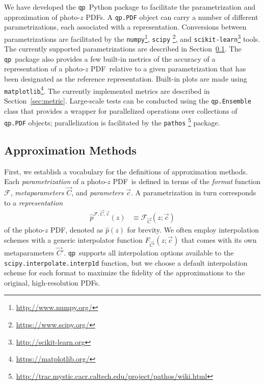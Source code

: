 \documentclass[\docopts]{\docclass}
\newcommand{\qp}{\texttt{qp}}
\newcommand{\pz}{photo-$z$ PDF}
\begin{document}
We have developed the \qp\ Python package to facilitate the parametrization and 
approximation of \pz s.
A \texttt{qp.PDF} object can carry a number of different parametrizations, each 
associated with a representation.
Conversions between parametrizations are facilitated by the 
\texttt{numpy}\footnote{\url{http://www.numpy.org/}}, \texttt{scipy} 
\footnote{\url{https://www.scipy.org/}}, and 
\texttt{scikit-learn}\footnote{\url{http://scikit-learn.org}} 
\citep{pedregosa_scikit-learn:_2011} tools.
The currently supported parametrizations are described in 
Section~\ref{sec:approx}.
The \qp\ package also provides a few built-in metrics of the accuracy of a 
representation of a \pz\ relative to a given parametrization that has been 
designated as the reference representation.
Built-in plots are made using 
\texttt{matplotlib}\footnote{\url{https://matplotlib.org/}}.
The currently implemented metrics are described in Section~\ref{sec:metric}.
Large-scale tests can be conducted using the \texttt{qp.Ensemble} class that 
provides a wrapper for parallelized operations over collections of 
\texttt{qp.PDF} objects; parallelization is facilitated by the \texttt{pathos} 
\footnote{\url{http://trac.mystic.cacr.caltech.edu/project/pathos/wiki.html}} 
\citep{mckerns_building_2012, mckerns_pathos:_2010} package.

\subsection{Approximation Methods}
\label{sec:approx}

First, we establish a vocabulary for the definitions of approximation methods.
Each \textit{parametrization} of a \pz\ is defined in terms of the 
\textit{format} function $\mathcal{F}$, \textit{metaparameters} $\vec{C}$, and 
\textit{parameters} $\vec{c}$.
A parametrization in turn corresponds to a \textit{representation}
\begin{align}
  \label{eq:definition}
  \hat{p}^{\mathcal{F}, \vec{C}, \vec{c}}(z) &\equiv \mathcal{F}_{\vec{C}}(z; 
\vec{c})
\end{align}
of the \pz, denoted as $\hat{p}(z)$ for brevity.
We often employ interpolation schemes with a generic interpolator function 
$F_{\vec{C}'}(z; \vec{c})$ that comes with its own metaparameters $\vec{C}'$.
\qp\ supports all interpolation options available to the 
\texttt{scipy.interpolate.interp1d} function, but we choose a default 
interpolation scheme for each format to maximize the fidelity of the 
approximations to the original, high-resolution PDFs.
\end{document}
